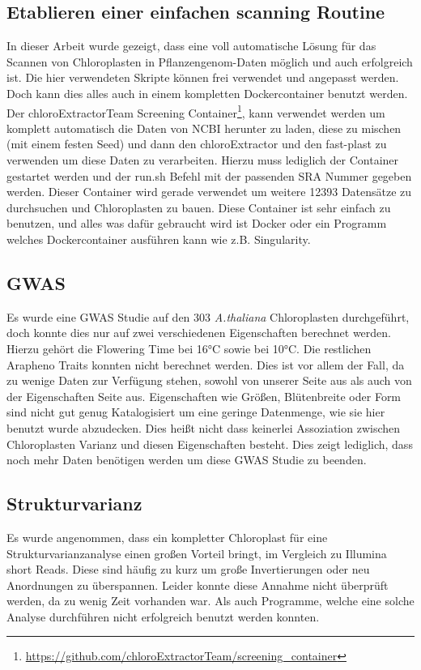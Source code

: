 \documentclass{scrartcl}
\begin{document}
\subsection{Etablieren einer einfachen scanning Routine}
\label{sec-5-5}
In dieser Arbeit wurde gezeigt, dass eine voll automatische Lösung für das Scannen von Chloroplasten in Pflanzengenom-Daten möglich und auch erfolgreich ist. Die hier verwendeten Skripte können frei verwendet und angepasst werden. 
Doch kann dies alles auch in einem kompletten Dockercontainer benutzt werden. Der chloroExtractorTeam Screening Container\footnote{\url{https://github.com/chloroExtractorTeam/screening_container}}, kann verwendet werden um komplett automatisch die Daten von NCBI herunter zu laden, diese zu mischen
(mit einem festen Seed) und dann den chloroExtractor und den fast-plast zu verwenden um diese Daten zu verarbeiten. Hierzu muss lediglich der Container gestartet werden und der run.sh Befehl mit der passenden SRA Nummer gegeben 
werden. Dieser Container wird gerade verwendet um weitere 12393 Datensätze zu durchsuchen und Chloroplasten zu bauen. Diese Container ist sehr einfach zu benutzen, und alles was dafür gebraucht wird ist Docker\footnotemark[49]{} oder ein Programm
welches Dockercontainer ausführen kann wie z.B. Singularity\footnotemark[18]{}. 
\subsection{GWAS}
\label{sec-5-6}
Es wurde eine GWAS Studie auf den 303 \emph{A.thaliana} Chloroplasten durchgeführt, doch konnte dies nur auf zwei verschiedenen Eigenschaften berechnet werden. Hierzu gehört die Flowering Time bei 16°C sowie bei 10°C. 
Die restlichen Arapheno Traits konnten nicht berechnet werden. Dies ist vor allem der Fall, da zu wenige Daten zur Verfügung stehen, sowohl von unserer Seite aus als auch von der Eigenschaften Seite aus. Eigenschaften wie
Größen, Blütenbreite oder Form sind nicht gut genug Katalogisiert um eine geringe Datenmenge, wie sie hier benutzt wurde abzudecken. Dies heißt nicht dass keinerlei Assoziation zwischen Chloroplasten Varianz und diesen Eigenschaften besteht.
Dies zeigt lediglich, dass noch mehr Daten benötigen werden um diese GWAS Studie zu beenden‌.
\subsection{Strukturvarianz}
\label{sec-5-7}
Es wurde angenommen, dass ein kompletter Chloroplast für eine Strukturvarianzanalyse einen großen Vorteil bringt, im Vergleich zu Illumina short Reads. Diese sind häufig zu kurz um große Invertierungen oder neu Anordnungen zu 
überspannen. Leider konnte diese Annahme nicht überprüft werden, da zu wenig Zeit vorhanden war. Als auch Programme, welche eine solche Analyse durchführen nicht erfolgreich benutzt werden konnten. 
\end{document}

